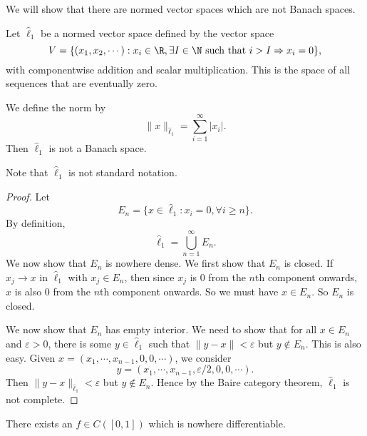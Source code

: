 \documentclass[a4paper]{article}
\begin{document}
We will show that there are normed vector spaces which are not Banach spaces.
\begin{prop}
  Let $\hat{\ell}_1$ be a normed vector space defined by the vector space
  \[
    V = \{(x_1, x_2, \cdots): x_i \in \R, \exists I \in \N \text{ such that } i > I \Rightarrow x_i = 0\},
  \]
  with componentwise addition and scalar multiplication. This is the space of all sequences that are eventually zero.

  We define the norm by
  \[
    \|x\|_{\hat{\ell}_1} = \sum_{i = 1}^\infty |x_i|.
  \]
  Then $\hat{\ell}_1$ is not a Banach space.
\end{prop}
Note that $\hat{\ell}_1$ is not standard notation.

\begin{proof}
  Let
  \[
    E_n = \{x\in \hat{\ell}_1: x_i = 0, \forall i \geq n\}.
  \]
  By definition,
  \[
    \hat{\ell}_1 = \bigcup_{n = 1}^\infty E_n.
  \]
  We now show that $E_n$ is nowhere dense. We first show that $E_n$ is closed. If $x_j \to x$ in $\hat{\ell}_1$ with $x_j \in E_n$, then since $x_j$ is $0$ from the $n$th component onwards, $x$ is also $0$ from the $n$th component onwards. So we must have $x \in E_n$. So $E_n$ is closed.

  We now show that $E_n$ has empty interior. We need to show that for all $x\in E_n$ and $\varepsilon > 0$, there is some $y \in \hat{\ell}_1$ such that $\|y - x\| < \varepsilon$ but $y\not\in E_n$. This is also easy. Given $x = (x_1, \cdots, x_{n - 1}, 0, 0, \cdots)$, we consider
  \[
    y = (x_1, \cdots, x_{n - 1}, \varepsilon/2, 0, 0,\cdots).
  \]
  Then $\|y - x\|_{\hat{\ell}_1} < \varepsilon$ but $y \not\in E_n$. Hence by the Baire category theorem, $\hat{\ell}_1$ is not complete.
\end{proof}

\begin{prop}
  There exists an $f\in C([0, 1])$ which is nowhere differentiable.
\end{prop}
\end{document}
